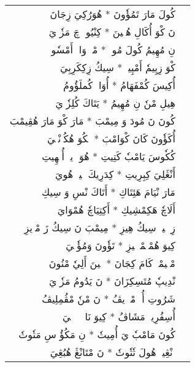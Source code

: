 \documentclass[a4paper, 12pt]{report}
\begin{document}
\begin{longtable}{rl}
\textarabic{كُولَ مَارَ تَمُؤٗونَ  *  هُوَرُكِيَ زِجَانَ} & \\ 
\textarabic{نَ كْوَ أُكَالِ هُنٖينَ  *  كِنْيُومٖ چَ مَزٗوٖيَ} & \\ 
[8mm] 

\textarabic{نِ مُهِيمُ كُولَ مُومٖ  *  مْكٖ وَاكٖ أَمْسٗومٖ} & \\ 
\textarabic{كْوَ زِپِيمٗ أَمْپِيمٖ  *  سِيكُ زِكِكَرِبِيَ} & \\ 
[8mm] 

\textarabic{أُكِيسَ كُمْفَهَامُ  *  أُوَاتٖ كُملَؤُومُ} & \\ 
\textarabic{هِيلِ مْنٗ نِ مُهِيمُ  *  يَتَاكَ كُلِزٗوٖيَ} & \\ 
[8mm] 

\textarabic{كُونَ نَ مُودَ وَ مِيمْبَ  *  مَارَ كْوَ مَارَ هُڤِيمْبَ} & \\ 
\textarabic{أُكَؤٗونَ كَانَ كْوَامْبَ  *  مٖكُوَ هُكُزٖنْڠٖيَ} & \\ 
[8mm] 

\textarabic{كُكٗوسَ يَامْبٗ كَتِيتِ  *  هُوَ وٖيوٖ أُمٖهِيتِ} & \\ 
\textarabic{أَنْڠَلِيَ كِبِرِيتِ  *  كِدَرِيكَ تٖيتٖ هُويَ} & \\ 
[8mm] 

\textarabic{مَارَ نْيَامَ هَئِتَاكِ  *  أَتَاكَ نْسِ وَ سِيكِ} & \\ 
\textarabic{أَلَاچٗ هَكِمْشِيكِ  *  أَكِتِيَاچٗ هُمْوَايَ} & \\ 
[8mm] 

\textarabic{زِئٖلٖيوٖ سِيكُ هِيزِ  *  مِيمْبَ نَ سِيكُ زَ مْوٖيزِ} & \\ 
\textarabic{كِيوَ هُمْبٖمْبٖلٖيزِ  *  تَؤٗونَ وَمُؤٗنٖيَ} & \\ 
[8mm] 

\textarabic{مْپٖيمْبٖ كَامَ كِجَانَ  *  تٖينَ أَلِيٗ مْنُونَ} & \\ 
\textarabic{نْدِيپٗ مُتَسِكِزَانَ  *  نَ يَدُومُ مَزٗوٖيَ} & \\ 
[8mm] 

\textarabic{شَرُوتِ أُوٖ مْوٖرٖيڤُ  *  نَ مْنٗ مْڤُمِلِيڤُ} & \\ 
\textarabic{أُسِفُرِيشٖ مَشَاڤُ  *  كِيوَ نَايٖ مٖتٖتٖيَ} & \\ 
[8mm] 

\textarabic{كُونَ مَامْبٗ يَ أُمِيتٗ  *  نِ مَكُؤُ سِ مَتٗوتٗ} & \\ 
\textarabic{وٖنْڠِينٖ هُولَ تٗتٗوتٗ  *  نَ مْتَانْڠَ هُبُڠِيَ} & \\ 
[8mm] 


\end{longtable}
\end{document}
